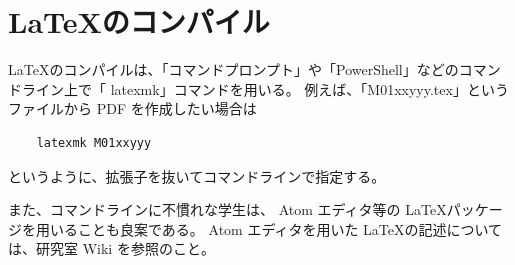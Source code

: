 \section{\LaTeX のコンパイル}
\LaTeX のコンパイルは、「コマンドプロンプト」や「PowerShell」などのコマンドライン上で「
latexmk」コマンドを用いる。
例えば、「M01xxyyy.tex」というファイルから PDF を作成したい場合は
\begin{verbatim}
    latexmk M01xxyyy
\end{verbatim}
というように、拡張子を抜いてコマンドラインで指定する。

また、コマンドラインに不慣れな学生は、
Atom エディタ等の \LaTeX パッケージを用いることも良案である。
Atom エディタを用いた \LaTeX の記述については、研究室 Wiki を参照のこと。
